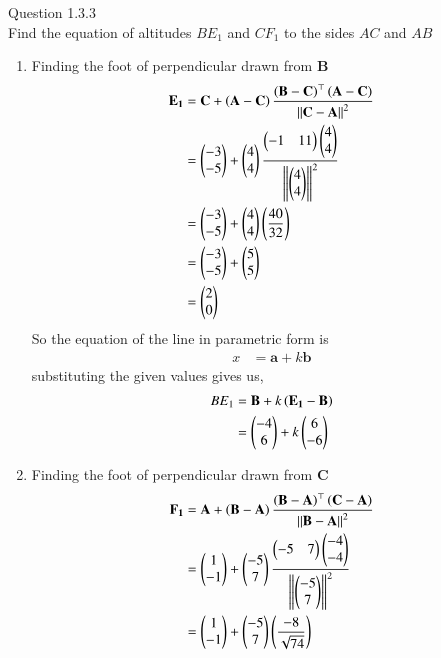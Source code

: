 \documentclass[journal,12pt,twocolumn]{IEEEtran}
\theoremstyle{remark}
\begin{document}
\let\vec\mathbf
Question 1.3.3\\
Find the equation of altitudes $BE_1$ and $CF_1$ to the sides $AC$ and $AB$\\
\solution
\begin{enumerate}
\item Finding the foot of perpendicular drawn from $\vec{B}$
\begin{align}
	\vec{E_1}&=\vec{C}+\brak{\vec{A}-\vec{C}}\frac{\brak{\vec{B}-\vec{C}}^{\top} \brak{\vec{A}-\vec{C}}}{\norm{\vec{C}-\vec{A}}^2}\\
	&=\myvec{-3\\-5}+\myvec{4\\4}\frac{\myvec{-1&11}\myvec{4\\4}}{\norm{\myvec{4\\4}}^2}\\
	&=\myvec{-3\\-5}+\myvec{4\\4} \brak{\frac{40}{32}}\\
	&=\myvec{-3\\-5}+\myvec{5\\5}\\
	&=\myvec{2\\0}
\end{align}
So the equation of the line in parametric form is
\begin{align}
	x&=\vec{a}+k \vec{b}
\end{align}
substituting the given values gives us,
\begin{align}
            BE_1&= \vec{B} + k \brak{ \vec{E_1}-\vec{B}}\\
            &=\myvec{-4\\6} + k \myvec{6\\-6}
\end{align}
\item Finding the foot of perpendicular drawn from $\vec{C}$
\begin{align}
	\vec{F_1}&=\vec{A}+\brak{\vec{B}-\vec{A}}\frac{\brak{\vec{B}-\vec{A}}^{\top} \brak{\vec{C}-\vec{A}}}{\norm{\vec{B}-\vec{A}}^2}\\
	&=\myvec{1\\-1}+\myvec{-5\\7}\frac{\myvec{-5&7}\myvec{-4\\-4}}{\norm{\myvec{-5\\7}}^2}\\
	&=\myvec{1\\-1}+\myvec{-5\\7} \brak{\frac{-8}{\sqrt{74}}}\\

\end{align}
\end{enumerate}
\end{document}

